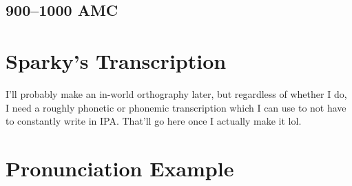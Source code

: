 \documentclass[a4paper,11pt,article,oneside]{memoir}
\begin{document}


\subsection{900--1000 AMC}



\section{Sparky's Transcription}

I'll probably make an in-world orthography later, but regardless of whether I do, I need a roughly phonetic or phonemic transcription which I can use to not have to constantly write in IPA. That'll go here once I actually make it lol.

\clearpage
\section{Pronunciation Example}


\end{document}
